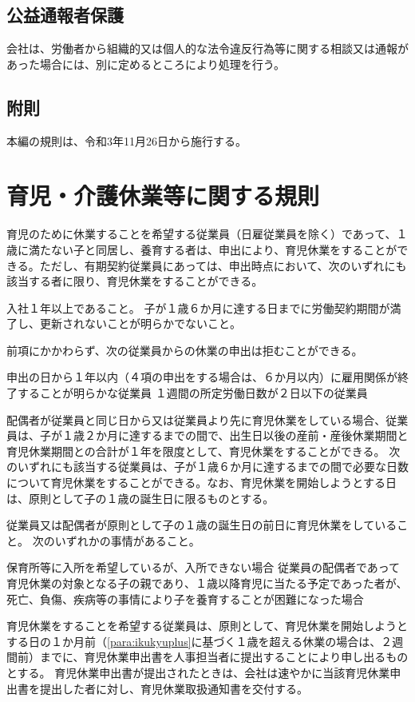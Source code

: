 \documentclass[10pt,a4paper,uplatex]{jsarticle}
\begin{document}
\subsection{公益通報者保護}

会社は、労働者から組織的又は個人的な法令違反行為等に関する相談又は通報があった場合には、別に定めるところにより処理を行う。

\subsection*{附則}
本編の規則は、令和3年11月26日から施行する。



\clearpage
\section{育児・介護休業等に関する規則}

育児のために休業することを希望する従業員（日雇従業員を除く）であって、１歳に満たない子と同居し、養育する者は、申出により、育児休業をすることができる。ただし、有期契約従業員にあっては、申出時点において、次のいずれにも該当する者に限り、育児休業をすることができる。
\label{para:ChildcareLayoff}
\begin{enumerate}
    \itm 入社１年以上であること。
    \itm 子が１歳６か月に達する日までに労働契約期間が満了し、更新されないことが明らかでないこと。
\end{enumerate}
\term 前項にかかわらず、次の従業員からの休業の申出は拒むことができる。
\begin{enumerate}
    \itm 申出の日から１年以内（４項の申出をする場合は、６か月以内）に雇用関係が終了することが明らかな従業員
    \itm １週間の所定労働日数が２日以下の従業員
\end{enumerate}
\term 配偶者が従業員と同じ日から又は従業員より先に育児休業をしている場合、従業員は、子が１歳２か月に達するまでの間で、出生日以後の産前・産後休業期間と育児休業期間との合計が１年を限度として、育児休業をすることができる。
\label{para:ikukyuplus}
\term 次のいずれにも該当する従業員は、子が１歳６か月に達するまでの間で必要な日数について育児休業をすることができる。なお、育児休業を開始しようとする日は、原則として子の１歳の誕生日に限るものとする。
\begin{enumerate}
    \itm 従業員又は配偶者が原則として子の１歳の誕生日の前日に育児休業をしていること。
    \itm 次のいずれかの事情があること。
    \begin{enumerate}
        \itm 保育所等に入所を希望しているが、入所できない場合
        \itm 従業員の配偶者であって育児休業の対象となる子の親であり、１歳以降育児に当たる予定であった者が、死亡、負傷、疾病等の事情により子を養育することが困難になった場合
    \end{enumerate}
\end{enumerate}
\term 育児休業をすることを希望する従業員は、原則として、育児休業を開始しようとする日の１か月前（\ref{para:ikukyuplus}に基づく１歳を超える休業の場合は、２週間前）までに、育児休業申出書を人事担当者に提出することにより申し出るものとする。
\term 育児休業申出書が提出されたときは、会社は速やかに当該育児休業申出書を提出した者に対し、育児休業取扱通知書を交付する。
\end{document}
